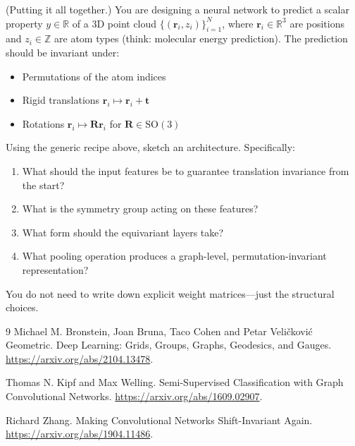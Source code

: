 \begin{problem}
    (Putting it all together.) You are designing a neural network to predict
    a scalar property $y \in \mathbb{R}$ of a 3D point cloud
    $\{(\mathbf{r}_i, z_i)\}_{i=1}^N$,
    where $\mathbf{r}_i \in \mathbb{R}^3$ are positions and $z_i \in \mathbb{Z}$
    are atom types (think: molecular energy prediction).
    The prediction should be invariant under:
    \begin{itemize}
        \item Permutations of the atom indices
        \item Rigid translations $\mathbf{r}_i \mapsto \mathbf{r}_i + \mathbf{t}$
        \item Rotations $\mathbf{r}_i \mapsto \mathbf{R} \mathbf{r}_i$ for $\mathbf{R} \in \text{SO}(3)$
    \end{itemize}
    Using the generic recipe above, sketch an architecture.
    Specifically:
    \begin{enumerate}
        \item[(a)] What should the input features be to guarantee translation invariance
        from the start?
        \item[(b)] What is the symmetry group acting on these features?
        \item[(c)] What form should the equivariant layers take?
        \item[(d)] What pooling operation produces a graph-level,
        permutation-invariant representation?
    \end{enumerate}
    You do not need to write down explicit weight matrices---just the structural choices.
\end{problem}


\begin{thebibliography}{9}
Michael M. Bronstein, Joan Bruna, Taco Cohen and Petar Veličković Geometric. Deep Learning: Grids, Groups, Graphs, Geodesics, and Gauges. \url{https://arxiv.org/abs/2104.13478}.

Thomas N. Kipf and Max Welling. Semi-Supervised Classification with Graph Convolutional Networks. \url{https://arxiv.org/abs/1609.02907}.

Richard Zhang. Making Convolutional Networks Shift-Invariant Again. \url{https://arxiv.org/abs/1904.11486}. 
\end{thebibliography}















